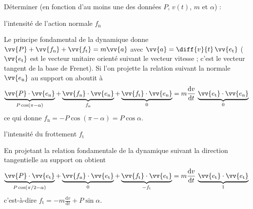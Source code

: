Déterminer (en fonction d'au moins une des données $P$, $v(t)$, $m$ et $\alpha$) :


\debutEntrainement

\begin{enonce}
l'intensité de l'action normale $f_\text{n}$
\end{enonce}


\begin{corrige}
Le principe fondamental de la dynamique donne $\vv{P}+\vv{f_\text{n}}+\vv{f_\text{t}}=m \vv{a}$ avec $\vv{a}=\diff{v}{t}\,\vv{e_\text{t}}$ ($\vv{e_\text{t}}$ est le vecteur unitaire orienté suivant le vecteur vitesse ; c'est le vecteur tangent de la base de Frenet). Si l'on projette la relation suivant la normale $\vv{e_\text{n}}$ au support on aboutit à 
	\[
		\underbrace{\vv{P}\cdot \vv{e_\text{n}}}_{P\cos(\pi-\alpha)}+
		\underbrace{\vv{f_\text{n}}\cdot \vv{e_\text{n}}}_{f_\text{n}}+
		\underbrace{\vv{f_\text{t}}\cdot \vv{e_\text{n}}}_{0}=
		m \frac{\mathrm{d}v}{\mathrm{d} t}\, \underbrace{\vv{e_\text{t}}\cdot \vv{e_\text{n}}}_{0}
	\]
	ce qui donne $f_\text{n}=-P\cos(\pi-\alpha)=P\cos\alpha$.
\end{corrige}

\begin{enonce}
l'intensité du frottement $f_\text{t}$
\end{enonce}


\begin{corrige}
En projetant la relation fondamentale de la dynamique suivant la direction tangentielle au support on obtient 
	\[
		\underbrace{\vv{P}\cdot \vv{e_\text{t}}}_{P\cos(\pi/2-\alpha)}+
		\underbrace{\vv{f_\text{n}}\cdot \vv{e_\text{t}}}_{0}+
		\underbrace{\vv{f_\text{t}}\cdot \vv{e_\text{t}}}_{-f_\text{t}}=
		m\frac{\mathrm{d}v}{\mathrm{d} t}\, \underbrace{\vv{e_\text{t}}\cdot \vv{e_\text{t}}}_{1}
	\]
	c'est-à-dire $f_\text{t}=-m \frac{\mathrm{d}v}{\mathrm{d} t}+P\sin\alpha$.
\end{corrige}

